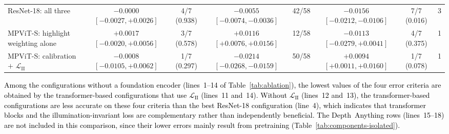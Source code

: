 \documentclass[a4paper,fleqn]{cas-dc}
\begin{document}
{\begin{table}[t]
{\begin{tabular}{@{}lccccccc@{}}
ResNet-18: all three & $-0.0000$ $[-0.0027, +0.0026]$ & 4/7 (0.938) & $\mathbf{-0.0055}$ $[-0.0074, -0.0036]$ & 42/58 & $\mathbf{-0.0156}$ $[-0.0212, -0.0106]$ & 7/7 (0.016) & 3 \\
MPViT-S: highlight weighting alone & $+0.0017$ $[-0.0020, +0.0056]$ & 3/7 (0.578) & $\mathbf{+0.0116}$ $[+0.0076, +0.0156]$ & 12/58 & $-0.0113$ $[-0.0279, +0.0041]$ & 4/7 (0.375) & 1 \\
MPViT-S: calibration $+$ $\mathcal{L}_\textrm{II}$ & $-0.0008$ $[-0.0105, +0.0062]$ & 1/7 (0.297) & $\mathbf{-0.0214}$ $[-0.0268, -0.0159]$ & 50/58 & $\mathbf{+0.0094}$ $[+0.0011, +0.0160]$ & 1/7 (0.078) & 1 \\
\bottomrule
\end{tabular}
}
\end{table}
%
\textcolor{black}
{ Among the configurations without a foundation encoder (lines~1--14 of Table~\ref{tab:ablation}), the lowest values of the four error criteria are obtained by the transformer-based configurations that use $\mathcal{L}_\textrm{II}$ (lines~11 and~14). Without $\mathcal{L}_\textrm{II}$ (lines~12 and~13), the transformer-based configurations are less accurate on these four criteria than the best ResNet-18 configuration (line~4), which indicates that transformer blocks and the illumination-invariant loss are complementary rather than independently beneficial. The Depth~Anything rows (lines~15--18) are not included in this comparison, since their lower errors mainly result from pretraining (Table~\ref{tab:components-isolated}).} \vspace*{1mm} \\

}
\end{document}
